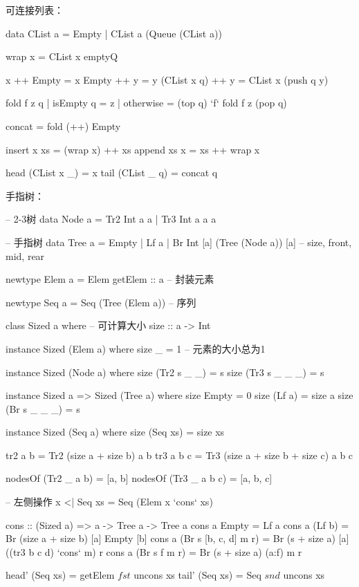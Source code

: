 \documentclass[b5paper]{ctexart}
\begin{document}
可连接列表：

\begin{Haskell}
data CList a = Empty | CList a (Queue (CList a))

wrap x = CList x emptyQ

x ++ Empty = x
Empty ++ y = y
(CList x q) ++ y = CList x (push q y)

fold f z q | isEmpty q = z
           | otherwise = (top q) `f` fold f z (pop q)

concat = fold (++) Empty

insert x xs = (wrap x) ++ xs
append xs x = xs ++ wrap x

head (CList x _) = x
tail (CList _ q) = concat q
\end{Haskell}

手指树：

\begin{Haskell}
-- 2-3树
data Node a = Tr2 Int a a
            | Tr3 Int a a a

-- 手指树
data Tree a = Empty
            | Lf a
            | Br Int [a] (Tree (Node a)) [a] -- size, front, mid, rear

newtype Elem a = Elem { getElem :: a } -- 封装元素

newtype Seq a = Seq (Tree (Elem a)) -- 序列

class Sized a where  -- 可计算大小
  size :: a -> Int

instance Sized (Elem a) where
  size _ = 1  -- 元素的大小总为1

instance Sized (Node a) where
  size (Tr2 s _ _) = s
  size (Tr3 s _ _ _) = s

instance Sized a => Sized (Tree a) where
  size Empty = 0
  size (Lf a) = size a
  size (Br s _ _ _) = s

instance Sized (Seq a) where
  size (Seq xs) = size xs

tr2 a b = Tr2 (size a + size b) a b
tr3 a b c = Tr3 (size a + size b + size c) a b c

nodesOf (Tr2 _ a b) = [a, b]
nodesOf (Tr3 _ a b c) = [a, b, c]

-- 左侧操作
x <| Seq xs = Seq (Elem x `cons` xs)

cons :: (Sized a) => a -> Tree a -> Tree a
cons a Empty = Lf a
cons a (Lf b) = Br (size a + size b) [a] Empty [b]
cons a (Br s [b, c, d] m r) = Br (s + size a) [a] ((tr3 b c d) `cons` m) r
cons a (Br s f m r) = Br (s + size a) (a:f) m r

head' (Seq xs) = getElem $ fst $ uncons xs
tail' (Seq xs) = Seq $ snd $ uncons xs


\end{Haskell}
\end{document}
